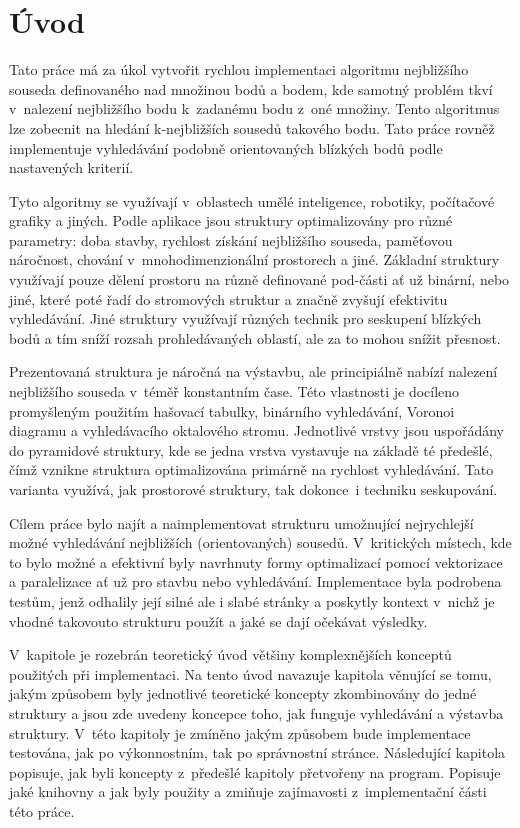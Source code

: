 
\chapter{Úvod}
Tato práce má za úkol vytvořit rychlou implementaci algoritmu nejbližšího souseda definovaného nad množinou bodů a bodem, kde samotný problém tkví v~nalezení nejbližšího bodu k~zadanému bodu z~oné množiny. Tento algoritmus lze zobecnit na hledání k-nejbližších sousedů takového bodu. Tato práce rovněž implementuje vyhledávání podobně orientovaných blízkých bodů podle nastavených kriterií.

Tyto algoritmy se využívají v~oblastech umělé inteligence, robotiky, počítačové grafiky a jiných. Podle aplikace jsou struktury optimalizovány pro různé parametry: doba stavby, rychlost získání nejbližšího souseda, paměťovou náročnost, chování v~mnohodimenzionální prostorech a jiné. Základní struktury využívají pouze dělení prostoru na různě definované pod-části ať už binární, nebo jiné, které poté řadí do stromových struktur a značně zvyšují efektivitu vyhledávání. Jiné struktury využívají různých technik pro seskupení blízkých bodů a tím sníží rozsah prohledávaných oblastí, ale za to mohou snížit přesnost. 

Prezentovaná struktura je náročná na výstavbu, ale principiálně nabízí nalezení nejbližšího souseda v~téměř konstantním čase. Této vlastnosti je docíleno promyšleným použitím hašovací tabulky, binárního vyhledávání, Voronoi diagramu a vyhledávacího oktalového stromu. Jednotlivé vrstvy jsou uspořádány do pyramidové struktury, kde se jedna vrstva vystavuje na základě té předešlé, čímž vznikne struktura optimalizována primárně na rychlost vyhledávání. Tato varianta využívá, jak prostorové struktury, tak dokonce~i techniku seskupování.

Cílem práce bylo najít a naimplementovat strukturu umožnující nejrychlejší možné vyhledávání nejbližších (orientovaných) sousedů. V~kritických místech, kde to bylo možné a efektivní byly navrhnuty formy optimalizací pomocí vektorizace a paralelizace ať už pro stavbu nebo vyhledávání. Implementace byla podrobena testům, jenž odhalily její silné ale i slabé stránky a poskytly kontext v~nichž je vhodné takovouto strukturu použít a jaké se dají očekávat výsledky. 

V~kapitole  je rozebrán teoretický úvod většiny komplexnějších konceptů použitých při implementaci. Na tento úvod navazuje kapitola věnující se tomu, jakým způsobem byly jednotlivé teoretické koncepty zkombinovány do jedné struktury a jsou zde uvedeny koncepce toho, jak funguje vyhledávání a výstavba struktury. V~této kapitoly je zmíněno jakým způsobem bude implementace testována, jak po výkonnostním, tak po správnostní stránce. Následující kapitola popisuje, jak byli koncepty z~předešlé kapitoly přetvořeny na program. Popisuje jaké knihovny a jak byly použity a zmiňuje zajímavosti z~implementační části této práce. 

